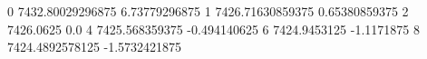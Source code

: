 0 7432.80029296875 6.73779296875
1 7426.71630859375 0.65380859375
2 7426.0625 0.0
4 7425.568359375 -0.494140625
6 7424.9453125 -1.1171875
8 7424.4892578125 -1.5732421875
